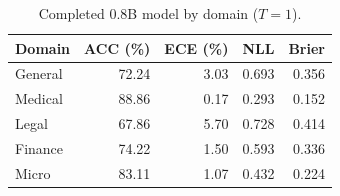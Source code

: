 \begin{table}[t]
\centering
\footnotesize
\setlength{\tabcolsep}{4pt}
\caption{Completed 0.8B model by domain ($T=1$).}
\label{tab:domain-detail}
\begin{tabular}{lrrrr}
\toprule
Domain & ACC (\%) & ECE (\%) & NLL & Brier \\
\midrule
General & 72.24 & 3.03 & 0.693 & 0.356 \\
Medical & 88.86 & 0.17 & 0.293 & 0.152 \\
Legal & 67.86 & 5.70 & 0.728 & 0.414 \\
Finance & 74.22 & 1.50 & 0.593 & 0.336 \\
Micro & 83.11 & 1.07 & 0.432 & 0.224 \\
\bottomrule
\end{tabular}
\end{table}

